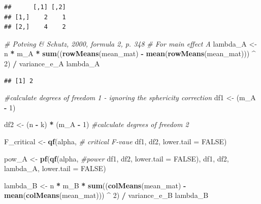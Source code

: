 \documentclass[]{book}
\newenvironment{Shaded}{\begin{snugshade}}{\end{snugshade}}
\newcommand{\CommentTok}[1]{\textcolor[rgb]{0.56,0.35,0.01}{\textit{#1}}}
\newcommand{\DataTypeTok}[1]{\textcolor[rgb]{0.13,0.29,0.53}{#1}}
\newcommand{\DecValTok}[1]{\textcolor[rgb]{0.00,0.00,0.81}{#1}}
\newcommand{\KeywordTok}[1]{\textcolor[rgb]{0.13,0.29,0.53}{\textbf{#1}}}
\newcommand{\NormalTok}[1]{#1}
\newcommand{\OperatorTok}[1]{\textcolor[rgb]{0.81,0.36,0.00}{\textbf{#1}}}
\newcommand{\OtherTok}[1]{\textcolor[rgb]{0.56,0.35,0.01}{#1}}
\newcommand{\StringTok}[1]{\textcolor[rgb]{0.31,0.60,0.02}{#1}}
\begin{document}
\begin{verbatim}
##      [,1] [,2]
## [1,]    2    1
## [2,]    4    2
\end{verbatim}

\begin{Shaded}
\begin{Highlighting}[]
\CommentTok{# Potving & Schutz, 2000, formula 2, p. 348}
\CommentTok{# For main effect A}
\NormalTok{lambda_A <-}
\StringTok{  }\NormalTok{n }\OperatorTok{*}\StringTok{ }\NormalTok{m_A }\OperatorTok{*}\StringTok{ }\KeywordTok{sum}\NormalTok{((}\KeywordTok{rowMeans}\NormalTok{(mean_mat) }\OperatorTok{-}\StringTok{ }
\StringTok{                   }\KeywordTok{mean}\NormalTok{(}\KeywordTok{rowMeans}\NormalTok{(mean_mat))) }\OperatorTok{^}\StringTok{ }\DecValTok{2}\NormalTok{) }\OperatorTok{/}\StringTok{ }\NormalTok{variance_e_A}
\NormalTok{  lambda_A}
\end{Highlighting}
\end{Shaded}

\begin{verbatim}
## [1] 2
\end{verbatim}

\begin{Shaded}
\begin{Highlighting}[]
\CommentTok{#calculate degrees of freedom 1 - ignoring the sphericity correction}
\NormalTok{df1 <-}\StringTok{ }\NormalTok{(m_A }\OperatorTok{-}\StringTok{ }\DecValTok{1}\NormalTok{) }

\NormalTok{df2 <-}\StringTok{ }\NormalTok{(n }\OperatorTok{-}\StringTok{ }\NormalTok{k) }\OperatorTok{*}\StringTok{ }\NormalTok{(m_A }\OperatorTok{-}\StringTok{ }\DecValTok{1}\NormalTok{) }\CommentTok{#calculate degrees of freedom 2}

\NormalTok{F_critical <-}\StringTok{ }\KeywordTok{qf}\NormalTok{(alpha, }\CommentTok{# critical F-vaue}
\NormalTok{                 df1,}
\NormalTok{                 df2, }
                 \DataTypeTok{lower.tail =} \OtherTok{FALSE}\NormalTok{) }

\NormalTok{pow_A <-}\StringTok{ }\KeywordTok{pf}\NormalTok{(}\KeywordTok{qf}\NormalTok{(alpha, }\CommentTok{#power }
\NormalTok{             df1, }
\NormalTok{             df2, }
             \DataTypeTok{lower.tail =} \OtherTok{FALSE}\NormalTok{), }
\NormalTok{          df1, }
\NormalTok{          df2, }
\NormalTok{          lambda_A, }
          \DataTypeTok{lower.tail =} \OtherTok{FALSE}\NormalTok{)}

\NormalTok{lambda_B <-}
\StringTok{  }\NormalTok{n }\OperatorTok{*}\StringTok{ }\NormalTok{m_B }\OperatorTok{*}\StringTok{ }\KeywordTok{sum}\NormalTok{((}\KeywordTok{colMeans}\NormalTok{(mean_mat) }\OperatorTok{-}\StringTok{ }
\StringTok{                   }\KeywordTok{mean}\NormalTok{(}\KeywordTok{colMeans}\NormalTok{(mean_mat))) }\OperatorTok{^}\StringTok{ }\DecValTok{2}\NormalTok{) }\OperatorTok{/}\StringTok{ }\NormalTok{variance_e_B }
\NormalTok{lambda_B}
\end{Highlighting}
\end{Shaded}
\end{document}
